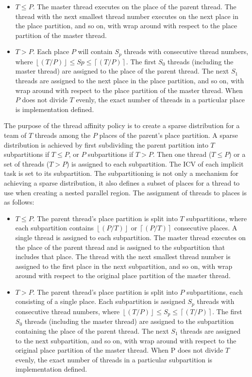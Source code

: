 \begin{itemize}
\item $T\leq P$.
The master thread executes on the place of the parent thread. The thread with the next smallest thread number executes on the next place in the place partition, and so on, with wrap around with respect to the place partition of the master thread.
\item $T>P$.
Each place $P$ will contain $S_{p}$ threads with consecutive thread numbers, 
where $\left \lfloor{(T/P)}\right \rfloor\leq Sp \leq \left \lceil{(T/P)}\right \rceil$. The first $S_{0}$ threads (including the master thread) are assigned to the place of the parent thread. The next $S_{1}$ threads are assigned to the next place in the place partition, and so on, with wrap around with respect to the place partition of the master thread. When $P$ does not divide $T$ evenly, the exact number of threads in a particular place is implementation defined.
\end{itemize}


The purpose of the  thread affinity policy is to create a sparse distribution for a 
team of $T$ threads among the $P$ places of the parent's place partition. A sparse distribution is achieved 
by first subdividing the parent partition into $T$ subpartitions if 
$T\leq P$, or $P$ subpartitions if $T>P$. Then one thread ($T\leq P$) or a 
set of threads ($T>P$) is assigned to each subpartition. The 
 ICV of each implicit task is set to its subpartition.
The subpartitioning is not only a mechanism for achieving a sparse 
distribution, it also defines a subset of places for a thread to use when 
creating a nested parallel region. The assignment of threads to places is as 
follows:

\begin{itemize}
\item $T\leq P$. The parent thread's place partition is split into $T$ subpartitions, where each subpartition 
contains $\left \lfloor{(P/T)}\right \rfloor$ or $\left \lceil{(P/T)}\right \rceil$ consecutive places. A single thread is assigned to each subpartition. The master thread executes on the place of the parent thread and is assigned to the subpartition that includes that place. The thread with the next smallest thread number is assigned to the first place in the next subpartition, and so on, with wrap around with respect to the original place partition of the master thread.

\item $T>P$. The parent thread's place partition is split into $P$ subpartitions, each consisting of a single place. Each subpartition is assigned $S_{p}$ threads with consecutive thread numbers, where $\left \lfloor{(T/P)}\right \rfloor\leq S_{p} \leq \left \lceil{(T/P)}\right \rceil$. The first $S_{0}$ threads (including the master thread) are assigned to the subpartition containing the place of the parent thread. The next $S_{1}$ threads are assigned to the next subpartition, and so on, with wrap around with respect to the original place partition of the master thread. When P does not divide $T$ evenly, the exact number of threads in a particular subpartition is implementation defined. 
\end{itemize}

